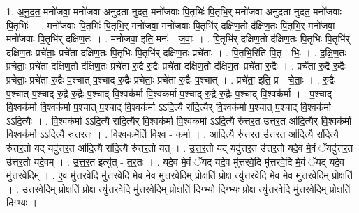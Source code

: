 \documentclass[17pt]{extarticle}
\begin{document}
1. अ॒नु॒द॒त॒ मनो॑जवा॒ मनो॑जवा अनुदता नुदत॒ मनो॑जवाः पि॒तृभिः॑ पि॒तृभि॒र् मनो॑जवा अनुदता नुदत॒ मनो॑जवाः पि॒तृभिः॑ । . मनो॑जवाः पि॒तृभिः॑ पि॒तृभि॒र् मनो॑जवा॒ मनो॑जवाः पि॒तृभि॑र् दक्षिण॒तो द॑क्षिण॒तः पि॒तृभि॒र् मनो॑जवा॒ मनो॑जवाः पि॒तृभि॑र् दक्षिण॒तः । . मनो॑जवा॒ इति॒ मनः॑ - ज॒वाः॒ । . पि॒तृभि॑र् दक्षिण॒तो द॑क्षिण॒तः पि॒तृभिः॑ पि॒तृभि॑र् दक्षिण॒तः प्रचे॑ताः॒ प्रचे॑ता दक्षिण॒तः 
पि॒तृभिः॑ पि॒तृभि॑र् दक्षिण॒तः प्रचे॑ताः । . पि॒तृभि॒रिति॑ पि॒तृ - भिः॒ । . द॒क्षि॒ण॒तः प्रचे॑ताः॒ प्रचे॑ता दक्षिण॒तो द॑क्षिण॒तः प्रचे॑ता रु॒द्रै रु॒द्रैः प्रचे॑ता दक्षिण॒तो द॑क्षिण॒तः प्रचे॑ता रु॒द्रैः । . प्रचे॑ता रु॒द्रै रु॒द्रैः प्रचे॑ताः॒ प्रचे॑ता रु॒द्रैः प॒श्चात् प॒श्चाद् रु॒द्रैः प्रचे॑ताः॒ प्रचे॑ता रु॒द्रैः प॒श्चात् । . प्रचे॑ता॒ इति॒ प्र - चे॒ताः॒ । . रु॒द्रैः प॒श्चात् प॒श्चाद् रु॒द्रै रु॒द्रैः प॒श्चाद् वि॒श्वक॑र्मा वि॒श्वक॑र्मा प॒श्चाद् रु॒द्रै रु॒द्रैः प॒श्चाद् वि॒श्वक॑र्मा । . प॒श्चाद् वि॒श्वक॑र्मा वि॒श्वक॑र्मा प॒श्चात् प॒श्चाद् वि॒श्वक॑र्मा ऽऽदि॒त्यै रा॑दि॒त्यैर् वि॒श्वक॑र्मा प॒श्चात् प॒श्चाद् वि॒श्वक॑र्मा ऽऽदि॒त्यैः । . वि॒श्वक॑र्मा ऽऽदि॒त्यै रा॑दि॒त्यैर् वि॒श्वक॑र्मा वि॒श्वक॑र्मा ऽऽदि॒त्यै रु॑त्तर॒त उ॑त्तर॒त आ॑दि॒त्यैर् वि॒श्वक॑र्मा वि॒श्वक॑र्मा ऽऽदि॒त्यै रु॑त्तर॒तः । . वि॒श्वक॒र्मेति॑ वि॒श्व - क॒र्मा॒ । . आ॒दि॒त्यै रु॑त्तर॒त उ॑त्तर॒त आ॑दि॒त्यै रा॑दि॒त्यै रु॑त्तर॒तो यद् यदु॑त्तर॒त आ॑दि॒त्यै रा॑दि॒त्यै रु॑त्तर॒तो यत् । . उ॒त्त॒र॒तो यद् यदु॑त्तर॒त उ॑त्तर॒तो यदे॒व मे॒वं ॅयदु॑त्तर॒त उ॑त्तर॒तो यदे॒वम् । . उ॒त्त॒र॒त इत्यु॑त् - त॒र॒तः । . यदे॒व मे॒वं ॅयद् यदे॒व मु॑त्तरवे॒दि मु॑त्तरवे॒दि मे॒वं ॅयद् यदे॒व मु॑त्तरवे॒दिम् । . ए॒व मु॑त्तरवे॒दि मु॑त्तरवे॒दि मे॒व मे॒व मु॑त्तरवे॒दिम् प्रो॒क्षति॑ प्रो॒क्ष त्यु॑त्तरवे॒दि मे॒व मे॒व मु॑त्तरवे॒दिम् प्रो॒क्षति॑ । . उ॒त्त॒र॒वे॒दिम् प्रो॒क्षति॑ प्रो॒क्ष त्यु॑त्तरवे॒दि मु॑त्तरवे॒दिम् प्रो॒क्षति॑ दि॒ग्भ्यो दि॒ग्भ्यः प्रो॒क्ष त्यु॑त्तरवे॒दि मु॑त्तरवे॒दिम् प्रो॒क्षति॑ दि॒ग्भ्यः । \newline
\end{document}
